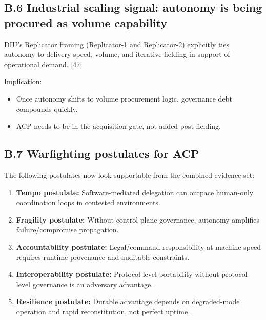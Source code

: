 \documentclass[
]{article}
\providecommand{\tightlist}{%
  \setlength{\itemsep}{0pt}\setlength{\parskip}{0pt}}
\begin{document}
\hypertarget{b.6-industrial-scaling-signal-autonomy-is-being-procured-as-volume-capability}{%
\subsection{B.6 Industrial scaling signal: autonomy is being procured as
volume
capability}\label{b.6-industrial-scaling-signal-autonomy-is-being-procured-as-volume-capability}}

DIU's Replicator framing (Replicator-1 and Replicator-2) explicitly ties
autonomy to delivery speed, volume, and iterative fielding in support of
operational demand. {[}47{]}

Implication:

\begin{itemize}
\tightlist
\item
  Once autonomy shifts to volume procurement logic, governance debt
  compounds quickly.
\item
  ACP needs to be in the acquisition gate, not added post-fielding.
\end{itemize}

\hypertarget{b.7-warfighting-postulates-for-acp}{%
\subsection{B.7 Warfighting postulates for
ACP}\label{b.7-warfighting-postulates-for-acp}}

The following postulates now look supportable from the combined evidence
set:

\begin{enumerate}
\def\labelenumi{\arabic{enumi}.}
\tightlist
\item
  \textbf{Tempo postulate:} Software-mediated delegation can outpace
  human-only coordination loops in contested environments.
\item
  \textbf{Fragility postulate:} Without control-plane governance,
  autonomy amplifies failure/compromise propagation.
\item
  \textbf{Accountability postulate:} Legal/command responsibility at
  machine speed requires runtime provenance and auditable constraints.
\item
  \textbf{Interoperability postulate:} Protocol-level portability
  without protocol-level governance is an adversary advantage.
\item
  \textbf{Resilience postulate:} Durable advantage depends on
  degraded-mode operation and rapid reconstitution, not perfect uptime.
\end{enumerate}
\end{document}
